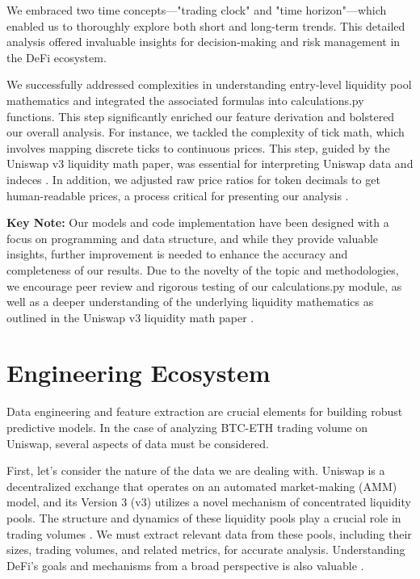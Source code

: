 \documentclass{article}
\begin{document}
We embraced two time concepts—"trading clock" and "time horizon"—which enabled us to thoroughly explore both short and long-term trends. This detailed analysis offered invaluable insights for decision-making and risk management in the DeFi ecosystem\cite{Miori2022}.

We successfully addressed complexities in understanding entry-level liquidity pool mathematics and integrated the associated formulas into calculations.py functions. This step significantly enriched our feature derivation and bolstered our overall analysis\cite{Elsts2021,Aigner2021}.
For instance, we tackled the complexity of tick math, which involves mapping discrete ticks to continuous prices. This step, guided by the Uniswap v3 liquidity math paper, was essential for interpreting Uniswap data and indeces \cite{Elsts2021}. In addition, we adjusted raw price ratios for token decimals to get human-readable prices, a process critical for presenting our analysis \cite{Elsts2021}.

\textbf{Key Note:} Our models and code implementation have been designed with a focus on programming and data structure, and while they provide valuable insights, further improvement is needed to enhance the accuracy and completeness of our results. Due to the novelty of the topic and methodologies, we encourage peer review and rigorous testing of our calculations.py module, as well as a deeper understanding of the underlying liquidity mathematics as outlined in the Uniswap v3 liquidity math paper \cite{Elsts2021,Miori2023}.

\section{\textbf{Engineering Ecosystem}}

Data engineering and feature extraction are crucial elements for building robust predictive models. In the case of analyzing BTC-ETH trading volume on Uniswap, several aspects of data must be considered.

First, let's consider the nature of the data we are dealing with. Uniswap is a decentralized exchange that operates on an automated market-making (AMM) model, and its Version 3 (v3) utilizes a novel mechanism of concentrated liquidity pools. The structure and dynamics of these liquidity pools play a crucial role in trading volumes \cite{Miori2023}. We must extract relevant data from these pools, including their sizes, trading volumes, and related metrics, for accurate analysis. Understanding DeFi's goals and mechanisms from a broad perspective is also valuable \cite{Makarov2022}.
\end{document}
